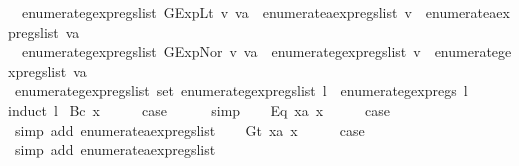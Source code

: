 \begin{isabellebody}
\ \ {\isachardoublequoteopen}enumerate{\isacharunderscore}gexp{\isacharunderscore}regs{\isacharunderscore}list\ {\isacharparenleft}GExp{\isachardot}Lt\ v\ va{\isacharparenright}\ {\isacharequal}\ enumerate{\isacharunderscore}aexp{\isacharunderscore}regs{\isacharunderscore}list\ v\ {\isacharat}\ enumerate{\isacharunderscore}aexp{\isacharunderscore}regs{\isacharunderscore}list\ va{\isachardoublequoteclose}\ {\isacharbar}\isanewline
\ \ {\isachardoublequoteopen}enumerate{\isacharunderscore}gexp{\isacharunderscore}regs{\isacharunderscore}list\ {\isacharparenleft}GExp{\isachardot}Nor\ v\ va{\isacharparenright}\ {\isacharequal}\ enumerate{\isacharunderscore}gexp{\isacharunderscore}regs{\isacharunderscore}list\ v\ {\isacharat}\ enumerate{\isacharunderscore}gexp{\isacharunderscore}regs{\isacharunderscore}list\ va{\isachardoublequoteclose}\isanewline
\isanewline
{}\isamarkupfalse%
\ enumerate{\isacharunderscore}gexp{\isacharunderscore}regs{\isacharunderscore}list{\isacharcolon}\ {\isachardoublequoteopen}set\ {\isacharparenleft}enumerate{\isacharunderscore}gexp{\isacharunderscore}regs{\isacharunderscore}list\ l{\isacharparenright}\ {\isacharequal}\ enumerate{\isacharunderscore}gexp{\isacharunderscore}regs\ l{\isachardoublequoteclose}\isanewline
%
\isadelimproof
%
\endisadelimproof
%
\isatagproof
{}\isamarkupfalse%
{\isacharparenleft}induct\ l{\isacharparenright}\isanewline
{}\isamarkupfalse%
\ {\isacharparenleft}Bc\ x{\isacharparenright}\isanewline
\ \ \isamarkupfalse%
\ \isamarkupfalse%
\ {\isacharquery}case\isanewline
\ \ \ \ \isamarkupfalse%
\ simp\isanewline
{}\isamarkupfalse%
\isanewline
\ \ \isamarkupfalse%
\ {\isacharparenleft}Eq\ x{}a\ x{}{\isacharparenright}\isanewline
\ \ \isamarkupfalse%
\ \isamarkupfalse%
\ {\isacharquery}case\isanewline
\ \ \ \ \isamarkupfalse%
\ {\isacharparenleft}simp\ add{\isacharcolon}\ enumerate{\isacharunderscore}aexp{\isacharunderscore}regs{\isacharunderscore}list{\isacharparenright}\isanewline
{}\isamarkupfalse%
\isanewline
\ \ \isamarkupfalse%
\ {\isacharparenleft}Gt\ x{}a\ x{}{\isacharparenright}\isanewline
\ \ \isamarkupfalse%
\ \isamarkupfalse%
\ {\isacharquery}case\isanewline
\ \ \ \ \isamarkupfalse%
\ {\isacharparenleft}simp\ add{\isacharcolon}\ enumerate{\isacharunderscore}aexp{\isacharunderscore}regs{\isacharunderscore}list{\isacharparenright}\isanewline

\end{isabellebody}
